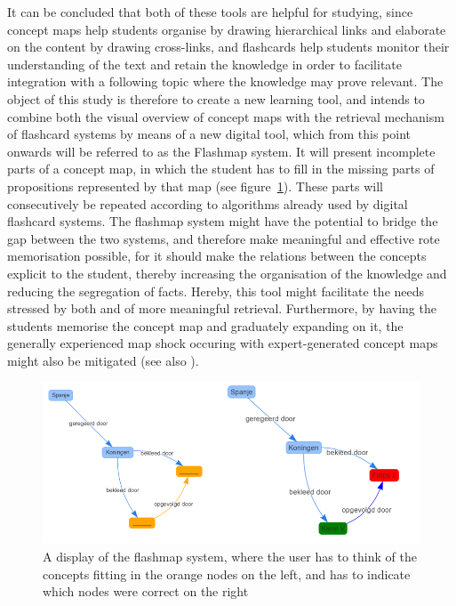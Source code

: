 It can be concluded that both of these tools are helpful for studying, since concept maps help students organise by drawing hierarchical links and elaborate on the content by drawing cross-links, and flashcards help students monitor their understanding of the text and retain the knowledge in order to facilitate integration with a following topic where the knowledge may prove relevant. The object of this study is therefore to create a new learning tool, and intends to combine both the visual overview of concept maps with the retrieval mechanism of flashcard systems by means of a new digital tool, which from this point onwards will be referred to as the Flashmap system. It will present incomplete parts of a concept map, in which the student has to fill in the missing parts of propositions represented by that map (see figure~\ref{fig:flashmap}). These parts will consecutively be repeated according to algorithms already used by digital flashcard systems. The flashmap system might have the potential to bridge the gap between the two systems, and therefore make meaningful and effective rote memorisation possible, for it should make the relations between the concepts explicit to the student, thereby increasing the organisation of the knowledge and reducing the segregation of facts. Hereby, this tool might facilitate the needs stressed by both  and  of more meaningful retrieval. Furthermore, by having the students memorise the concept map and graduately expanding on it, the generally experienced map shock occuring with expert-generated concept maps might also be mitigated (see also ).

\begin{figure}
    \centering
    \includegraphics[width=\textwidth]{img/flashmap}
    \caption{A display of the flashmap system, where the user has to think of the concepts fitting in the orange nodes on the left, and has to indicate which nodes were correct on the right}
    \label{fig:flashmap}
\end{figure}

